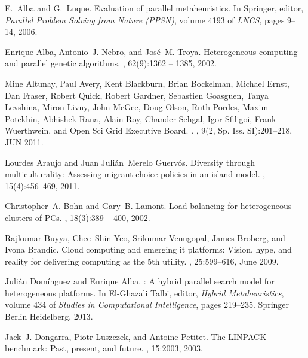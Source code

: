 \documentclass[final,1p,times]{elsarticle}
\begin{document}
\begin{thebibliography}{10}

E.~Alba and G.~Luque.
\newblock Evaluation of parallel metaheuristics.
\newblock In Springer, editor, {\em Parallel Problem Solving from Nature
  (PPSN)}, volume 4193 of {\em LNCS}, pages 9--14, 2006.

Enrique Alba, Antonio~J. Nebro, and Jos\'e~M. Troya.
\newblock Heterogeneous computing and parallel genetic algorithms.
, 62(9):1362 --
  1385, 2002.

Mine Altunay, Paul Avery, Kent Blackburn, Brian Bockelman, Michael Ernst, Dan
  Fraser, Robert Quick, Robert Gardner, Sebastien Goasguen, Tanya Levshina,
  Miron Livny, John McGee, Doug Olson, Ruth Pordes, Maxim Potekhin, Abhishek
  Rana, Alain Roy, Chander Sehgal, Igor Sfiligoi, Frank Wuerthwein, and {Open
  Sci Grid Executive Board}.
.
, {9}({2, Sp. Iss. SI}):{201--218},
  {JUN} 2011.

Lourdes Araujo and Juan Juli{\'a}n~Merelo Guerv{\'o}s.
\newblock Diversity through multiculturality: Assessing migrant choice policies
  in an island model.
, 15(4):456--469, 2011.

Christopher~A. Bohn and Gary~B. Lamont.
\newblock Load balancing for heterogeneous clusters of {PCs}.
, 18(3):389 -- 400, 2002.

Rajkumar Buyya, Chee~Shin Yeo, Srikumar Venugopal, James Broberg, and Ivona
  Brandic.
\newblock Cloud computing and emerging it platforms: Vision, hype, and reality
  for delivering computing as the 5th utility.
, 25:599--616, June 2009.

Juli\'an Dom\'inguez and Enrique Alba.
: A hybrid parallel search model for heterogeneous
  platforms.
\newblock In El-Ghazali Talbi, editor, {\em Hybrid Metaheuristics}, volume 434
  of {\em Studies in Computational Intelligence}, pages 219--235. Springer
  Berlin Heidelberg, 2013.

Jack~J. Dongarra, Piotr Luszczek, and Antoine Petitet.
\newblock The {LINPACK} benchmark: Past, present, and future.
, 15:2003,
  2003.


\end{thebibliography}
\end{document}
